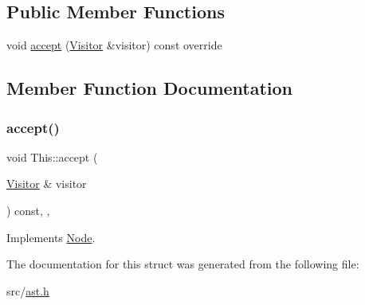 \subsection*{Public Member Functions}
\begin{DoxyCompactItemize}
\item 
void \hyperlink{struct_this_a9ff113a898e7756ce6854c8167dddb15}{accept} (\hyperlink{struct_visitor}{Visitor} \&visitor) const override
\end{DoxyCompactItemize}


\subsection{Member Function Documentation}
\mbox{\label{struct_this_a9ff113a898e7756ce6854c8167dddb15}} 
\subsubsection{\texorpdfstring{accept()}{accept()}}
{\footnotesize\ttfamily void This\+::accept (\begin{DoxyParamCaption}\item[{\hyperlink{struct_visitor}{Visitor} \&}]{visitor }\end{DoxyParamCaption}) const\hspace{0.3cm}{\ttfamily [inline]}, {\ttfamily [override]}, {\ttfamily [virtual]}}



Implements \hyperlink{struct_node_a10bd7af968140bbf5fa461298a969c71}{Node}.



The documentation for this struct was generated from the following file\+:\begin{DoxyCompactItemize}
\item 
src/\hyperlink{ast_8h}{ast.\+h}\end{DoxyCompactItemize}
